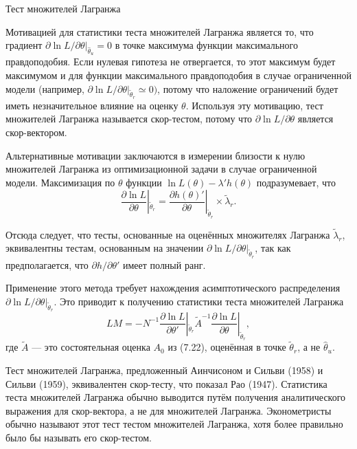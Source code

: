 \begin{center}
Тест множителей Лагранжа
\end{center}

Мотивацией для статистики теста множителей Лагранжа является то, что градиент $\partial{\ln L}/\partial{\theta}|_{\hat{\theta}_u} = 0$ в точке максимума функции максимального правдоподобия. Если нулевая гипотеза не отвергается, то этот максимум будет максимумом и для функции максимального правдоподобия в случае ограниченной модели (например, $\partial{\ln L}/\partial{\theta}|_{\tilde{\theta}_r} \simeq 0)$, потому что наложение ограничений будет иметь незначительное влияние на оценку $\theta$. Используя эту мотивацию, тест множителей Лагранжа называется  скор-тестом, потому что $\partial{\ln L}/\partial{\theta}$ является скор-вектором.

Альтернативные мотивации заключаются в измерении близости к нулю множителей Лагранжа из оптимизационной задачи в случае ограниченной модели. Максимизация по $\theta$ функции $\ln L(\theta) - \lambda'h(\theta)$ подразумевает, что
\begin{equation}
\frac{\partial{\ln L}}{\partial{\theta}}|_{\tilde{\theta}_r} = \frac{\partial{h(\theta)'}}{\partial{\theta}}|_{\tilde{\theta}_r} \times \tilde{\lambda}_r.
\end{equation}

Отсюда следует, что тесты, основанные на оценённых множителях Лагранжа $\tilde{\lambda}_r$, эквивалентны тестам, основанным на значении $\partial{\ln L}/\partial{\theta}|_{\tilde{\theta}_r}$, так как предполагается, что $\partial{h}/\partial{\theta}'$ имеет полный ранг.

Применение этого метода требует нахождения асимптотического распределения $\partial{\ln L}/\partial{\theta}|_{\tilde{\theta}_r}$. Это приводит к получению статистики теста множителей Лагранжа
\begin{equation}
LM = -N^{-1}\frac{\partial{\ln L}}{\partial{\theta}'}|_{\tilde{\theta}_r}\tilde{A}^{-1}\frac{\partial{\ln L}}{\partial{\theta}}|_{\tilde{\theta}_r}, 
\end{equation}
где $\tilde{A}$ --- это состоятельная оценка $A_0$ из (7.22), оценённая в точке $\tilde{\theta}_r$, а не $\hat{\theta}_u$.

Тест множителей Лагранжа, предложенный Аинчисоном и Сильви (1958) и Сильви (1959), эквивалентен скор-тесту, что показал Рао (1947). Статистика теста множителей Лагранжа обычно выводится путём получения аналитического выражения для скор-вектора, а не для множителей Лагранжа. Эконометристы обычно называют этот тест тестом множителей Лагранжа, хотя более правильно было бы называть его скор-тестом.

